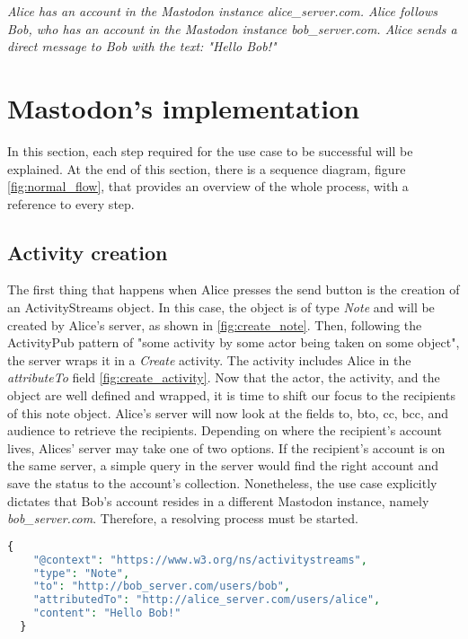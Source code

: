 \emph{Alice has an account in the Mastodon instance alice\_server.com. Alice follows Bob, who has an account in the Mastodon instance bob\_server.com. Alice sends a direct message to Bob with the text: "Hello Bob!" }

\pagebreak

\section{Mastodon's implementation}
In this section, each step required for the use case to be successful will be explained. At the end of this section, there is a sequence diagram, figure \ref{fig:normal_flow}, that provides an overview of the whole process, with a reference to every step. 

\subsection{Activity creation}
The first thing that happens when Alice presses the send button is the creation of an ActivityStreams object. In this case, the object is of type \emph{Note} and will be created by Alice's server, as shown in \ref{fig:create_note}. Then, following the ActivityPub pattern of "some activity by some actor being taken on some object"\cite{lemmer-webber_tallon_guy_prodromou_2018}, the server wraps it in a \emph{Create} activity. The activity includes Alice in the \emph{attributeTo} field \ref{fig:create_activity}. Now that the actor, the activity, and the object are well defined and wrapped, it is time to shift our focus to the recipients of this note object. 
Alice's server will now look at the fields to, bto, cc, bcc, and audience to retrieve the recipients. Depending on where the recipient's account lives, Alices' server may take one of two options. If the recipient's account is on the same server, a simple query in the server would find the right account and save the status to the account's collection. Nonetheless, the use case explicitly dictates that Bob's account resides in a different Mastodon instance, namely \emph{bob\_server.com}. Therefore, a resolving process must be started.

\lstset{style=JSONStyle}
\begin{lstlisting}[language=PHP, caption=ActivityStreams note object, label=fig:create_note]
  {
    "@context": "https://www.w3.org/ns/activitystreams",
    "type": "Note",
    "to": "http://bob_server.com/users/bob",
    "attributedTo": "http://alice_server.com/users/alice",
    "content": "Hello Bob!"
  }
\end{lstlisting}


